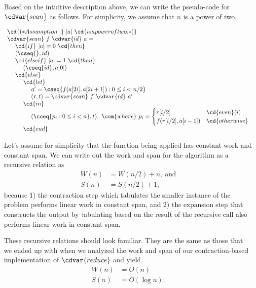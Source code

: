 \begin{algorithm}
\label{alg:design::contraction::scan}

Based on the intuitive description above, we can write the pseudo-code
for $\cdvar{scan}$ as  follows.
%
For simplicity, we assume that $n$ is a power of two.
%

\[
\begin{array}{l}
\cd{(* Assumption:}~|a|~\cd{is a power of two. *)}
\\
\cdvar{scan}~f~\cdvar{id}~a =
\\
~~~~\cd{if}~|a| = 0~\cd{then} 
\\
~~~~\left(\cseq{}, id\right)
\\
~~~~\cd{else if}~|a| = 1 ~\cd{then}
\\
~~~~~~~~\left( \cseq{id}, a[0] \right)
\\
~~~~\cd{else}
\\ 
~~~~~~~~\cd{let}
\\
~~~~~~~~~~~~a' = \cseq{ f(a[2i],a[2i+1]) : 0 \leq i < n/2}
\\
~~~~~~~~~~~~(r,t) = \cdvar{scan}~f~\cdvar{id}~ a'
\\
~~~~~~~~\cd{in}
\\ 
~~~~~~~~~~~~(\cseq{ p_i : 0 \leq i < n }, t),~\com{where}~p_i = 
%
\begin{cases}
     r[i/2]  & \cd{even}(i) \\
     f(r[i/2], a[i-1]) & \cd{otherwise}
\end{cases}
%
\\
~~~~~~~~\cd{end}
\end{array}
\]
\end{algorithm}


\begin{gram}
Let's assume for simplicity that the function being applied has
constant work and constant span. We can write out the work and span
for the algorithm as a recursive relation as 
\begin{align*}
W(n) &= W(n/2) + n,~\mbox{and}
\\
S(n) &= S(n/2) + 1,
\end{align*}
because 1) the contraction step which tabulates the smaller instance
of the problem performs linear work in constant span, and 2) the
expansion step that constructs the output by tabulating based on the
result of the recursive call also performs linear work in constant
span.

These recursive relations should look familiar.  They are the same as
those that we ended up with when we analyzed the work and span of our
contraction-based implementation of $\cdvar{reduce}$ and  yield 
\begin{align*}
W(n) &= O(n)
\\
S(n) &=  O(\log{n}).
\end{align*}
\end{gram}

